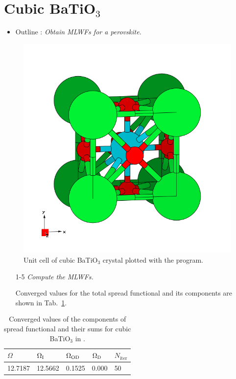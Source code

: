 \section{Cubic BaTiO$_3$}
\label{sec9:BaTiO3}

\begin{itemize}
	\item Outline : {\it Obtain MLWFs for a perovskite.}
\end{itemize}

\begin{figure}[h!]
\centering
\includegraphics[width=0.25\columnwidth,trim={45pt 45pt 55pt 55pt},clip]{figure/example09/BaTiO3.png}
\caption{Unit cell of cubic BaTiO$_3$ crystal plotted with the \xcrysden{} program.}
\label{fig9.0}
\end{figure}

\begin{itemize}
	\item[1-5] {\it Compute the MLWFs.}

	Converged values for the total spread functional and its components are shown in Tab.~\ref{tab9.1}. 
\end{itemize}

\begin{table}[b!]
	\centering
	\captionsetup{width=.5\textwidth}
	\caption{Converged values of the components of spread functional and their sums for cubic BaTiO$_3$ in \angsqd{}.}
	\begin{tabular}{@{} lllll @{}}\toprule[1.5pt]
	$\Omega$ & $\Omega\tinysub{I}$ & $\Omega\tinysub{OD}$ & $\Omega\tinysub{D}$ & $N_{\mathrm{iter}}$ \\\midrule
	12.7187 & 12.5662 & 0.1525 &  0.000 & 50 \\\bottomrule[1pt]
	\end{tabular}\label{tab9.1}
\end{table} 

